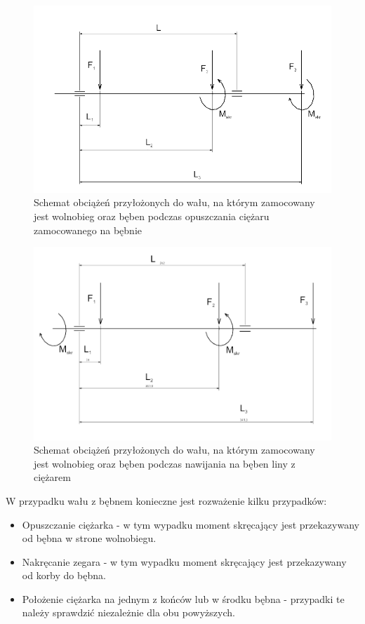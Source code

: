         	
        
        
        	\begin{figure}[th]
        		\centering
        		\includegraphics[width=0.9\linewidth]{Projekt/shaft_beben}
        		\caption{Schemat obciążeń przyłożonych do wału, na którym zamocowany jest wolnobieg oraz bęben podczas opuszczania ciężaru zamocowanego na bębnie} 
        		\label{fig::shaft_beben}
        	\end{figure}
        	\begin{figure}[th]
				\centering
				\includegraphics[width=0.9\linewidth]{Projekt/shaft_beben2}
				\caption{Schemat obciążeń przyłożonych do wału, na którym zamocowany jest wolnobieg oraz bęben podczas nawijania na bęben liny z ciężarem} 
				\label{fig::shaft_beben2}
			\end{figure}        
        
        	W przypadku wału z bębnem konieczne jest rozważenie kilku przypadków:
        \begin{itemize}
        	\item Opuszczanie ciężarka - w tym wypadku moment skręcający jest przekazywany od bębna w strone wolnobiegu.
        	\item Nakręcanie zegara - w tym wypadku moment skręcający jest przekazywany od korby do bębna.
        	\item Położenie ciężarka na jednym z końców lub w środku bębna - przypadki te należy sprawdzić niezależnie dla obu powyższych.
        \end{itemize}
        
